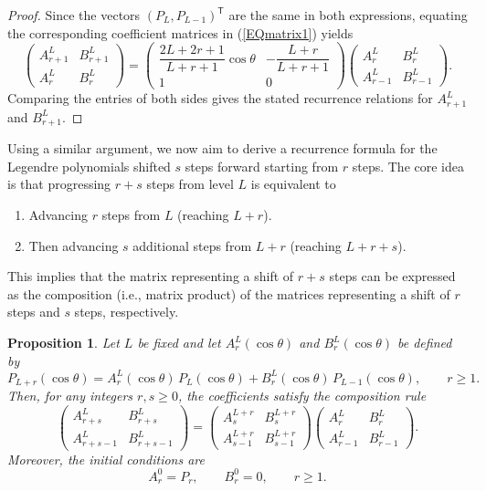 \documentclass[11pt]{article}
\renewcommand\eqref[1]{(\ref{#1})} %
\newtheorem{prop}[thm]{Proposition}
\theoremstyle{definition}
\theoremstyle{remark}
\numberwithin{equation}{section}
\begin{document}
\begin{proof}
Since the vectors $(P_L, P_{L-1})^{\mathsf T}$ are the same in both expressions,
equating the corresponding coefficient matrices in \eqref{EQmatrix1} yields
\[
\begin{pmatrix}
A_{r+1}^L & B_{r+1}^L \\
A_r^L & B_r^L
\end{pmatrix}
=
\begin{pmatrix}
\dfrac{2L+2r+1}{L+r+1}\cos\theta &
-\dfrac{L+r}{L+r+1} \\
1 & 0
\end{pmatrix}
\begin{pmatrix}
A_r^L & B_r^L \\
A_{r-1}^L & B_{r-1}^L
\end{pmatrix}.
\]
Comparing the entries of both sides gives the stated recurrence relations for
$A_{r+1}^L$ and $B_{r+1}^L$.
\end{proof}

Using a similar argument, we now aim to derive a recurrence formula for the Legendre polynomials shifted $s$ steps forward starting from $r$ steps. The core idea is that progressing $r + s$ steps from level $L$ is equivalent to
\begin{enumerate}
\item Advancing $r$ steps from $L$ (reaching $L + r$).
\item Then advancing $s$ additional steps from $L + r$ (reaching $L + r + s$).
\end{enumerate}

This implies that the matrix representing a shift of $r + s$ steps can be expressed as the composition (i.e., matrix product) of the matrices representing a shift of $r$ steps and $s$ steps, respectively.

\begin{prop}\label{Prop-P_l}
Let $L$ be fixed and let $A_r^L(\cos\theta)$ and $B_r^L(\cos\theta)$ be defined by
\[
P_{L+r}(\cos\theta)
= A_r^L(\cos\theta)\, P_L(\cos\theta)
+ B_r^L(\cos\theta)\, P_{L-1}(\cos\theta),
\qquad r \ge 1.
\]
Then, for any integers $r,s \ge 0$, the coefficients satisfy the composition rule
\begin{equation}\label{eq:composition}
\begin{pmatrix}
A_{r+s}^L & B_{r+s}^L \\
A_{r+s-1}^L & B_{r+s-1}^L
\end{pmatrix}
=
\begin{pmatrix}
A_s^{L+r} & B_s^{L+r} \\
A_{s-1}^{L+r} & B_{s-1}^{L+r}
\end{pmatrix}
\begin{pmatrix}
A_r^L & B_r^L \\
A_{r-1}^L & B_{r-1}^L
\end{pmatrix}.
\end{equation}
Moreover, the initial conditions are
\[
A_r^0 = P_r, \qquad B_r^0 = 0, \qquad r \ge 1.
\]
\end{prop}
\end{document}
